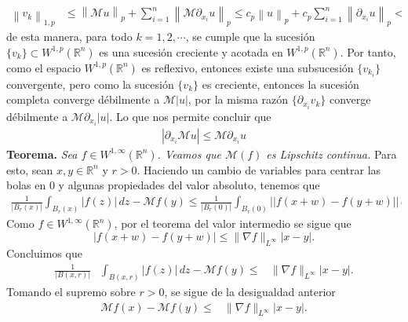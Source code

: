 \documentclass[final]{beamer}
\providecommand{\norm}[1]{\left\|#1\right\|}
\newlength{\colwidth}
\begin{document}
\begin{frame}[t]
\begin{columns}[t]
\begin{column}{\colwidth}
\begin{alertblock}{}
      \begin{align*}
        \norm{v_k}_{1,p}&\leq \norm{\mathcal{M}u}_{p}+\sum_{i=1}^{n}\norm{\mathcal{M}\partial_{x_{i}}u}_{p}\leq c_p\norm{u}_{p}+c_{p}\sum_{i=1}^{n}\norm{\partial_{x_{i}}u}_{p}<\infty,
      \end{align*}
      de esta manera, para todo $k=1,2,\cdots$, se cumple que la sucesión $\{v_{k}\}\subset W^{1,p}(\mathbb{R}^{n})$ es una sucesión creciente y acotada en $W^{1,p}(\mathbb{R}^{n})$. Por tanto, como el espacio $W^{1,p}(\mathbb{R}^{n})$ es reflexivo, entonces existe una subsucesión $\{v_{k_{i}}\}$ convergente, pero como la sucesión $\{v_{k}\}$ es creciente, entonces la sucesión completa converge débilmente a $\mathcal{M}|u|$, por la misma razón $\{\partial_{x_{i}}v_{k}\}$ converge débilmente a $\mathcal{M}\partial_{x_i}|u|$. Lo que nos permite concluir que
      \begin{align*}
        |\partial_{x_i}\mathcal{M}u|\leq \mathcal{M}\partial_{x_i}u
      \end{align*}
    \textbf{Teorema.}\emph{ Sea $f\in W^{1,\infty}(\mathbb{R}^n)$. Veamos que $\mathcal{M}(f)$ es Lipschitz continua.} Para esto, sean $x,y\in \mathbb{R}^n$ y $r>0$. Haciendo un cambio de variables para centrar las bolas en $0$ y algunas propiedades del valor absoluto, tenemos que
      \begin{align*}
        \frac{1}{|B_{r}(x)|}\int_{B_r(x)} |f(z)|\, dz-\mathcal{M}f(y)\leq \frac{1}{|B_{r}(0)|}\int_{B_{r}(0)} \Big||f(x+w)-f(y+w)|\Big|\, dw.
      \end{align*}
      Como $f\in W^{1,\infty}(\mathbb{R}^n)$, por el teorema del valor intermedio se sigue que
      \begin{equation*}
      \big|f(x+w)-f(y+w)\big|\leq \|\nabla f\|_{L^{\infty}} |x-y|.   
      \end{equation*}
      Concluimos que 
      \begin{equation*}
      \begin{aligned}
      \frac{1}{|B(x,r)|}&\int_{B(x,r)} |f(z)|\, dz-\mathcal{M}f(y)\leq & \|\nabla f\|_{L^{\infty}} |x-y|.
      \end{aligned}
      \end{equation*}
      Tomando el supremo sobre $r>0$, se sigue de la desigualdad anterior 
      \begin{equation*}
      \begin{aligned}
      \mathcal{M}f(x)-\mathcal{M}f(y)\leq & \|\nabla f\|_{L^{\infty}} |x-y|.
      \end{aligned}

\end{equation*}
\end{alertblock}
\end{column}
\end{columns}
\end{frame}
\end{document}
